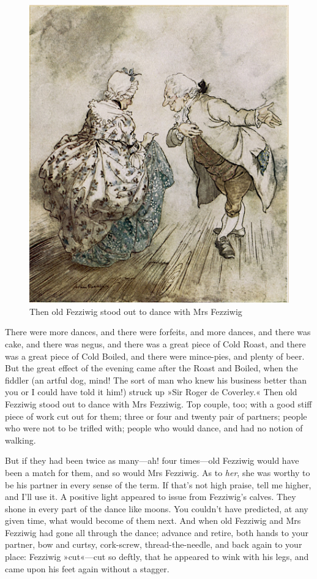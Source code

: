 \begin{figure}[p]
\begin{minipage}[c]{\textwidth}
\includegraphics[width=\textwidth]{fezzidanceimproved}
\caption[\textbf{To dance with Mrs Fezziwig}]{Then old Fezziwig stood out to dance with Mrs Fezziwig}
\end{minipage}
\end{figure}


There were more dances, and there were forfeits, and more dan\-ces, and there was cake, and there was negus, and there was a great piece of Cold Roast, and there was a great piece of Cold Boiled, and there were mince-pies, and plenty of beer. But the great effect of the evening came after the Roast and Boiled, when the fiddler (an artful dog, mind! The sort of man who knew his business better than you or I could have told it him!) struck up »Sir Roger de Coverley.« Then old Fezziwig stood out to dance with Mrs Fezziwig. Top couple, too; with a good stiff piece of work cut out for them; three or four and twenty pair of partners; people who were not to be trifled with; people who would dance, and had no notion of walking.

But if they had been twice as many—ah! four times—old Fezziwig would have been a match for them, and so would Mrs Fezziwig. As to \textit{her}, she was worthy to be his partner in every sense of the term. If that's not high praise, tell me higher, and I'll use it. A positive light appeared to issue from Fezziwig's calves. They shone in every part of the dance like moons. You couldn't have predicted, at any given time, what would become of them next. And when old Fezziwig and Mrs Fezziwig had gone all through the dance; advance and retire, both hands to your partner, bow and curtsy, cork-screw, thread-the-needle, and back again to your place: Fezziwig »cut«—cut so deftly, that he appeared to wink with his legs, and came upon his feet again without a stagger.

